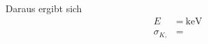 
\noindent

\begin{table}[H]
    \centering
        \caption{Wertepaare für die Extrema und den berechneten Mittelpunkt.}
        \label{tab:energie}
        \begin{tabular}{S S[table-format=2.2] S}
          \toprule
          {Punkt} & {$\theta [\si{\degree}]$} & {$N$}\\
          \midrule
          {$I_{K,Min  $} & & \\
          {$I_{K,Max  $} & & \\
          {$I_{K,Mitte$} & & \\
          \bottomrule
        \end{tabular}
      \end{table}
Daraus ergibt sich
\begin{align*}
    E_{}&=\SI{}{\kilo\electronvolt}\\
    \sigma_{K,}&=
\end{align*}